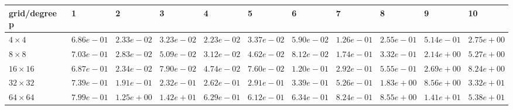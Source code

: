 \begin{tabular}{lllllllllll}
\hline
 grid/degree p   & 1          & 2          & 3          & 4          & 5          & 6          & 7          & 8          & 9          & 10         \\
\hline
 $4 \times 4$    & $6.86e-01$ & $2.33e-02$ & $3.23e-02$ & $2.23e-02$ & $3.37e-02$ & $5.90e-02$ & $1.26e-01$ & $2.55e-01$ & $5.14e-01$ & $2.75e+00$ \\
 $8 \times 8$    & $7.03e-01$ & $2.83e-02$ & $5.09e-02$ & $3.12e-02$ & $4.62e-02$ & $8.12e-02$ & $1.74e-01$ & $3.32e-01$ & $2.14e+00$ & $5.27e+00$ \\
 $16 \times 16$  & $6.87e-01$ & $2.34e-02$ & $7.90e-02$ & $4.74e-02$ & $7.60e-02$ & $1.20e-01$ & $2.92e-01$ & $5.55e-01$ & $2.69e+00$ & $8.24e+00$ \\
 $32 \times 32$  & $7.39e-01$ & $1.91e-01$ & $2.32e-01$ & $2.62e-01$ & $2.91e-01$ & $3.39e-01$ & $5.26e-01$ & $1.83e+00$ & $8.56e+00$ & $3.32e+01$ \\
 $64 \times 64$  & $7.99e-01$ & $1.25e+00$ & $1.42e+01$ & $6.29e-01$ & $6.12e-01$ & $6.34e-01$ & $8.24e-01$ & $8.55e+00$ & $1.41e+01$ & $5.38e+01$ \\
\hline
\end{tabular}